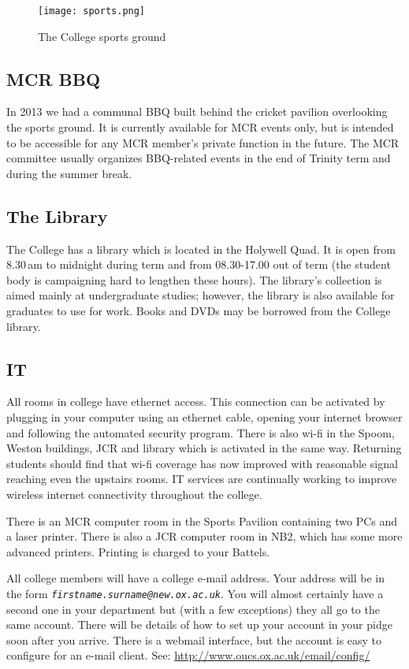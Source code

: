 \documentclass[a4paper,fleqn,12pt]{book} %
\begin{document}
\begin{figure}[htbp]
\centering
\texttt{[image: sports.png]}
\caption[]{The College sports ground}
\label{fig:sports}
\end{figure}

\subsection{MCR BBQ}
In 2013 we had a communal BBQ built behind the cricket pavilion overlooking the sports ground. It is currently available for MCR events only, but is intended to be accessible for any MCR member's private function in the future. The MCR committee usually organizes BBQ-related events in the end of Trinity term and during the summer break.
\subsection{The Library}
The College has a library which is located in the Holywell Quad. It is open from
8.30\,am to midnight during term and from 08.30-17.00 out of term (the student body is campaigning hard to lengthen these hours). The library's collection is aimed mainly at undergraduate studies; however, the library is also available for graduates to use for work. Books and DVDs may be borrowed from the College library.
\subsection{IT}
All rooms in college have ethernet access. This connection can be activated by plugging in your computer using an ethernet cable, opening your internet browser and following the automated security program. There is also wi-fi in the Spoom, Weston buildings, JCR and library which is activated in the same way. Returning students should  find that wi-fi coverage has now improved with reasonable signal reaching even the upstairs rooms. IT services are continually working to improve wireless internet connectivity throughout the college. 

There is an MCR computer room in the Sports Pavilion containing two PCs and a laser printer. There is also a JCR computer room in NB2, which has some more advanced printers. Printing is charged to your Battels. 

All college members will have a college e-mail address. Your address will be in the
form \emph{\nolinkurl{firstname.surname@new.ox.ac.uk}}. You will almost
certainly have a second one in your department but (with a few exceptions) they all go to the same account.
There will be details of how to set up your account in your pidge soon after you
arrive. There is a webmail interface, but the account is easy to configure for
an e-mail client. See: \url{http://www.oucs.ox.ac.uk/email/config/}
\end{document}

